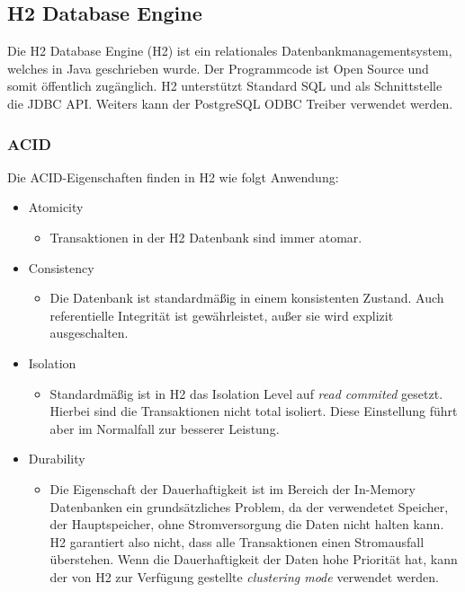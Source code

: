 \documentclass[draft,final]{vutinfth} %
\begin{document}
\subsection{H2 Database Engine}

Die H2 Database Engine (H2) ist ein relationales Datenbankmanagementsystem, welches in Java geschrieben wurde. Der Programmcode ist Open Source und somit öffentlich zugänglich. H2 unterstützt Standard SQL und als Schnittstelle die JDBC API. Weiters kann der PostgreSQL ODBC Treiber verwendet werden.

\subsubsection*{ACID}
Die ACID-Eigenschaften finden in H2 wie folgt Anwendung:
\begin{itemize}
	\item Atomicity
	\begin{itemize}
		\item Transaktionen in der H2 Datenbank sind immer atomar.
	\end{itemize}
	\item Consistency
	\begin{itemize}
		\item Die Datenbank ist standardmä{\ss}ig in einem konsistenten Zustand. Auch referentielle Integrität ist gewährleistet, au\ss er sie wird explizit ausgeschalten.
	\end{itemize}
	\item Isolation
	\begin{itemize}
		\item Standardmä{\ss}ig ist in H2 das Isolation Level auf \textit{read commited} gesetzt. Hierbei sind die Transaktionen nicht total isoliert. Diese Einstellung führt aber im Normalfall zur besserer Leistung.
	\end{itemize}
	\item Durability
	\begin{itemize}
		\item Die Eigenschaft der Dauerhaftigkeit ist im Bereich der In-Memory Datenbanken ein grundsätzliches Problem, da der verwendetet Speicher, der Hauptspeicher, ohne Stromversorgung die Daten nicht halten kann. H2 garantiert also nicht, dass alle Transaktionen einen Stromausfall überstehen. Wenn die Dauerhaftigkeit der Daten hohe Priorität hat, kann der von H2 zur Verfügung gestellte \textit{clustering mode} verwendet werden. 
	\end{itemize}
\end{itemize}
\end{document}

